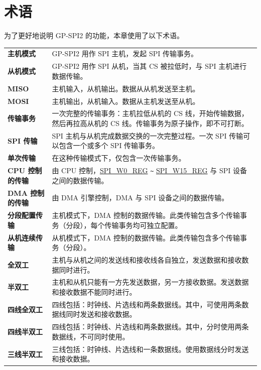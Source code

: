 \section{术语}

为了更好地说明 GP-SPI2 的功能，本章使用了以下术语。 

\begin{longtable}[c]{ R{4cm} p{10cm} }

\textbf{主机模式}     & GP-SPI2 用作 SPI 主机，发起 SPI 传输事务。\\ 
\textbf{从机模式}      & GP-SPI2 用作 SPI 从机，当其 CS 被拉低时，与 SPI 主机进行数据传输。\\
\textbf{MISO}       & 主机输入，从机输出。数据从从机发送至主机。\\
\textbf{MOSI}  & 主机输出，从机输入。数据从主机发送至从机。\\ 
\textbf{传输事务} & 一次完整的传输事务：主机拉低从机的 CS 线，开始传输数据，然后再拉高从机的 CS 线。传输事务为原子操作，即不可打断。\\
\textbf{SPI 传输} & SPI 主机与从机完成数据交换的一次完整过程。一次 SPI 传输可以包含一个或多个 SPI 传输事务。\\
\textbf{单次传输} & 在这种传输模式下，仅包含一次传输事务。\\
\textbf{CPU 控制的传输}& 由 CPU 控制，\hyperref[regdesc:SPIW0REG]{SPI\_W0\_REG} \verb+~+ \hyperref[regdesc:SPIW0REG]{SPI\_W15\_REG} 与 SPI 设备之间的数据传输。\\
\textbf{DMA 控制的传输}& 由 DMA 引擎控制，DMA 与 SPI 设备之间的数据传输。\\
\textbf{分段配置传输}& 主机模式下，DMA 控制的数据传输。此类传输包含多个传输事务（分段），每个传输事务均可独立配置。\\
\textbf{从机连续传输} & 从机模式下，DMA 控制的数据传输。此类传输包含多个传输事务（分段）。\\
\textbf{全双工} & 主机与从机之间的发送线和接收线各自独立，发送数据和接收数据同时进行。\\
\textbf{半双工} & 主机和从机只能有一方先发送数据，另一方接收数据。发送数据和接收数据不能同时进行。\\
\textbf{四线全双工} & 四线包括：时钟线、片选线和两条数据线。其中，可使用两条数据线同时发送和接收数据。\\
\textbf{四线半双工} & 四线包括：时钟线、片选线和两条数据线。其中，分时使用两条数据线，不可同时使用。\\
\textbf{三线半双工} & 三线包括：时钟线、片选线和一条数据线。使用数据线分时发送和接收数据。\\

\end{longtable}
